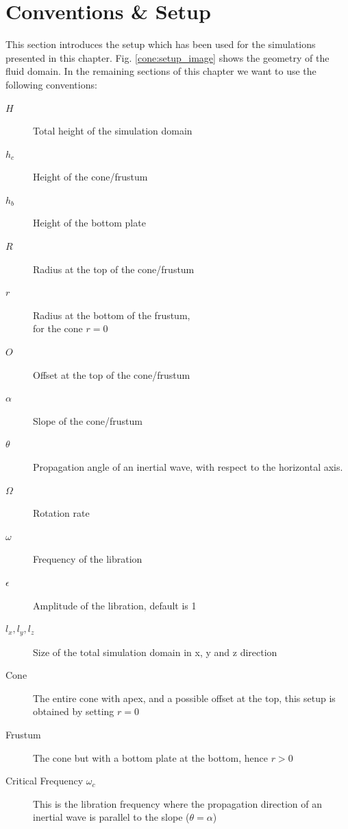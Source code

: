 \section{Conventions \& Setup}
\label{cone:convsetup}

This section introduces the setup which has been used for the simulations presented in this chapter.
Fig. \ref{cone:setup_image} shows the geometry of the fluid domain.
In the remaining sections of this chapter we want to use the following conventions:

\begin{multicols}{2}
\begin{description}
    \item[$H$]{Total height of the simulation domain}
    \item[$h_c$]{Height of the cone/frustum}
    \item[$h_b$]{Height of the bottom plate}
    \item[$R$]{Radius at the top of the cone/frustum}
    \item[$r$]{Radius at the bottom  of the frustum,\\ for the cone $r=0$}
    \item[$O$]{Offset at the top of the cone/frustum}
    \item[$\alpha$]{Slope of the cone/frustum}
    \item[$\theta$]{Propagation angle of an inertial wave, with respect to the horizontal axis.}
    \item[$\Omega$]{Rotation rate}
    \item[$\omega$]{Frequency of the libration}
    \item[$\epsilon$]{Amplitude of the libration, default is 1}%
    \item[$l_x, l_y, l_z$]{Size of the total simulation domain in x, y and z direction}
    \item[Cone] {The entire cone with apex, and a possible offset at the top, this setup is obtained by setting $r=0$}
    \item[Frustum]{The cone but with a bottom plate at the bottom, hence $r>0$}
    \item[Critical Frequency $\omega_c$]{This is the libration frequency where the propagation direction of an inertial wave is parallel to the slope ($\theta=\alpha$)}
\end{description}
\end{multicols}


